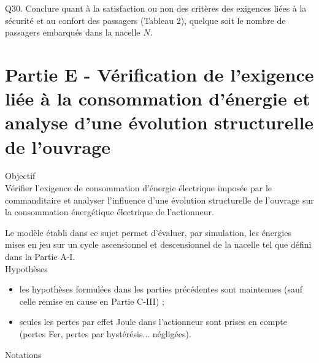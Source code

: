 \documentclass[10pt]{article}
\begin{document}
Q30. Conclure quant à la satisfaction ou non des critères des exigences liées à la sécurité et au confort des passagers (Tableau 2), quelque soit le nombre de passagers embarqués dans la nacelle $N$.

\section*{Partie E - Vérification de l'exigence liée à la consommation d'énergie et analyse d'une évolution structurelle de l'ouvrage}
Objectif\\
Vérifier l'exigence de consommation d'énergie électrique imposée par le commanditaire et analyser l'influence d'une évolution structurelle de l'ouvrage sur la consommation énergétique électrique de l'actionneur.

Le modèle établi dans ce sujet permet d'évaluer, par simulation, les énergies mises en jeu sur un cycle ascensionnel et descensionnel de la nacelle tel que défini dans la Partie A-I.\\
Hypothèses

\begin{itemize}
  \item[-] les hypothèses formulées dans les parties précédentes sont maintenues (sauf celle remise en cause en Partie C-III) ;
  \item[-] seules les pertes par effet Joule dans l'actionneur sont prises en compte (pertes Fer, pertes par hystérésis... négligées).
\end{itemize}

Notations
\end{document}
